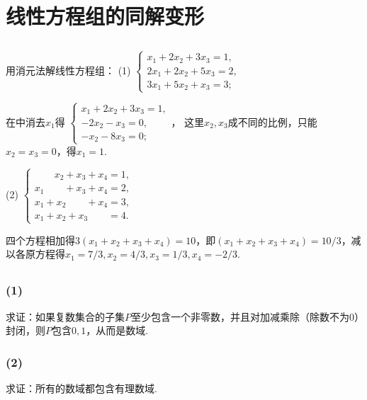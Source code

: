 \section{线性方程组的同解变形}
\subsection{}
用消元法解线性方程组：
(1)
$\begin{cases}
	x_1+2x_2+3x_3=1,\\
	2x_1+2x_2+5x_3=2,\\
	3x_1+5x_2+x_3=3;
\end{cases}$

\jie 在中消去$x_1$得
$\begin{cases}
	x_1+2x_2+3x_3=1,\\
	-2x_2-x_3=0,\\
	-x_2-8x_3=0;
\end{cases}$，
这里$x_2,x_3$成不同的比例，只能$x_2=x_3=0$，得$x_1=1$.

(2)
$
\begin{cases}
	\qquad x_2+x_3+x_4=1,\\
	x_1\qquad+x_3+x_4=2,\\
	x_1+x_2\qquad+x_4=3,\\
	x_1+x_2+x_3\qquad=4.
\end{cases}
$

\jie 四个方程相加得$3(x_1+x_2+x_3+x_4)=10$，即$(x_1+x_2+x_3+x_4)=10/3$，减以各原方程得$x_1=7/3, x_2=4/3, x_3=1/3, x_4=-2/3$.

\subsection{}
\subsubsection{(1)}
求证：如果复数集合的子集$P$至少包含一个非零数，并且对加减乘除（除数不为0）封闭，则$P$包含$0,1$，从而是数域.


\subsubsection{(2)}
求证：所有的数域都包含有理数域.


